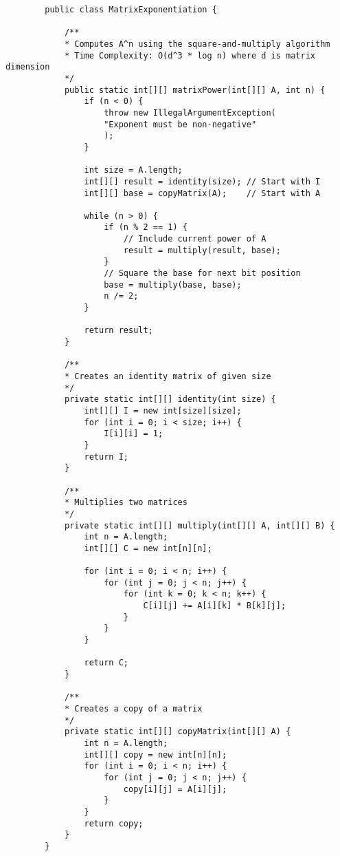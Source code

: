 \documentclass{article}
\begin{document}
	\begin{lstlisting}
		public class MatrixExponentiation {
			
			/**
			* Computes A^n using the square-and-multiply algorithm
			* Time Complexity: O(d^3 * log n) where d is matrix dimension
			*/
			public static int[][] matrixPower(int[][] A, int n) {
				if (n < 0) {
					throw new IllegalArgumentException(
					"Exponent must be non-negative"
					);
				}
				
				int size = A.length;
				int[][] result = identity(size); // Start with I
				int[][] base = copyMatrix(A);    // Start with A
				
				while (n > 0) {
					if (n % 2 == 1) {
						// Include current power of A
						result = multiply(result, base);
					}
					// Square the base for next bit position
					base = multiply(base, base);
					n /= 2;
				}
				
				return result;
			}
			
			/**
			* Creates an identity matrix of given size
			*/
			private static int[][] identity(int size) {
				int[][] I = new int[size][size];
				for (int i = 0; i < size; i++) {
					I[i][i] = 1;
				}
				return I;
			}
			
			/**
			* Multiplies two matrices
			*/
			private static int[][] multiply(int[][] A, int[][] B) {
				int n = A.length;
				int[][] C = new int[n][n];
				
				for (int i = 0; i < n; i++) {
					for (int j = 0; j < n; j++) {
						for (int k = 0; k < n; k++) {
							C[i][j] += A[i][k] * B[k][j];
						}
					}
				}
				
				return C;
			}
			
			/**
			* Creates a copy of a matrix
			*/
			private static int[][] copyMatrix(int[][] A) {
				int n = A.length;
				int[][] copy = new int[n][n];
				for (int i = 0; i < n; i++) {
					for (int j = 0; j < n; j++) {
						copy[i][j] = A[i][j];
					}
				}
				return copy;
			}
		}
	\end{lstlisting}
	
\end{document}
